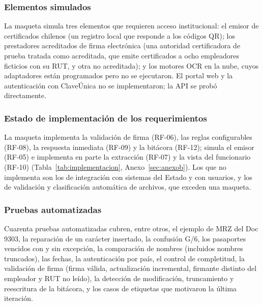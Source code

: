 \documentclass[11pt,a4paper]{article}
\begin{document}
\subsubsection{Elementos simulados}
La maqueta simula tres elementos que requieren acceso institucional: el emisor de certificados chilenos (un registro local que responde a los códigos QR); los prestadores acreditados de firma electrónica (una autoridad certificadora de prueba tratada como acreditada, que emite certificados a ocho empleadores ficticios con su RUT, y otra no acreditada); y los motores OCR en la nube, cuyos adaptadores están programados pero no se ejecutaron. El portal web y la autenticación con ClaveÚnica no se implementaron; la API se probó directamente.

\subsubsection{Estado de implementación de los requerimientos}
La maqueta implementa la validación de firma (RF-06), las reglas configurables (RF-08), la respuesta inmediata (RF-09) y la bitácora (RF-12); simula el emisor (RF-05) e implementa en parte la extracción (RF-07) y la vista del funcionario (RF-10) (Tabla~\ref{tab:implementacion}, Anexo~\ref{sec:anexob}). Los que no implementa son los de integración con sistemas del Estado y con usuarios, y los de validación y clasificación automática de archivos, que exceden una maqueta.

\subsubsection{Pruebas automatizadas}
Cuarenta pruebas automatizadas cubren, entre otros, el ejemplo de MRZ del Doc 9303, la reparación de un carácter insertado, la confusión G/6, los pasaportes vencidos con y sin excepción, la comparación de nombres (incluidos nombres truncados), las fechas, la autenticación por país, el control de completitud, la validación de firma (firma válida, actualización incremental, firmante distinto del empleador y RUT no leído), la detección de modificación, truncamiento y reescritura de la bitácora, y los casos de etiquetas que motivaron la última iteración.
\end{document}
